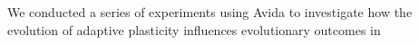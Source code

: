







We conducted a series of experiments using Avida to investigate how the evolution of adaptive plasticity influences evolutionary outcomes in  